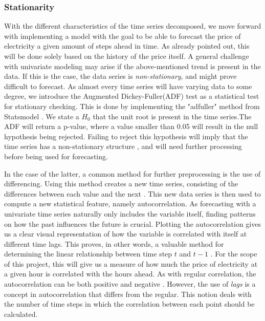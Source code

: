 \documentclass
[twocolumn,
secnumarabic,
nobibnotes,
aps,
prl,
reprint,
groupedaddress,
amsmath,
amssymb,
]{revtex4-2}
\begin{document}
\subsubsection{Stationarity}
With the different characteristics of the time series decomposed, we move forward with implementing a model with the goal to be able to forecast the price of electricity a given amount of steps ahead in time. As already pointed out, this will be done solely based on the history of the price itself. A general challenge with univariate modeling may arise if the above-mentioned trend is present in the data. If this is the case, the data series is \emph{non-stationary}, and might prove difficult to forecast. As almost every time series will have varying data to some degree, we introduce the Augmented Dickey-Fuller(ADF) test as a statistical test for stationary checking. This is done by implementing the "adfuller" method from Statsmodel \cite{seabold2010statsmodels}. We state a $H_0$ that the unit root is present in the time series.The ADF will return a p-value, where a value smaller than 0.05 will result in the null hypothesis being rejected. Failing to reject this hypothesis will imply that the time series has a non-stationary structure \cite{Vishwas2020}, and will need further processing before being used for forecasting.  

In the case of the latter, a common method for further preprocessing is the use of differencing. Using this method creates a new time series, consisting of the differences between each value and the next \cite{Korstanje2021}. This new data series is then used to compute a new statistical feature, namely autocorrelation. As forecasting with a univariate time series naturally only includes the variable itself, finding patterns on how the past influences the future is crucial. Plotting the autocorrelation gives us a clear visual representation of how the variable is correlated with itself at different time lags. This proves, in other words, a valuable method for determining the linear relationship between time step $t$ and $t-1$ \cite{Vishwas2020}. For the scope of this project, this will give us a measure of how much the price of electricity at a given hour is correlated with the hours ahead. As with regular correlation, the autocorrelation can be both positive and negative \cite{Korstanje2021}. However, the use of \emph{lags} is a concept in autocorrelation that differs from the regular. This notion deals with the number of time steps in which the correlation between each point should be calculated. 
\end{document}

